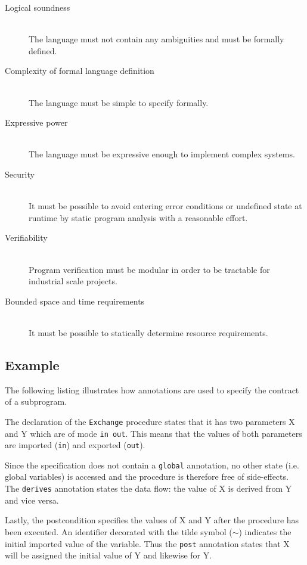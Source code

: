 \begin{description}
	\item[Logical soundness] \hfill \\
		The language must not contain any ambiguities and must be formally
		defined.
	\item[Complexity of formal language definition] \hfill \\
		The language must be simple to specify formally.
	\item[Expressive power] \hfill \\
		The language must be expressive enough to implement complex systems.
	\item[Security] \hfill \\
		It must be possible to avoid entering error conditions or undefined
		state at runtime by static program analysis with a reasonable effort.
	\item[Verifiability] \hfill \\
		Program verification must be modular in order to be tractable for
		industrial scale projects.
	\item[Bounded space and time requirements] \hfill \\
		It must be possible to statically determine resource requirements.
\end{description}

\subsection{Example}
The following listing illustrates how annotations are used to specify the
contract of a subprogram.



The declaration of the \texttt{Exchange} procedure states that it has two
parameters X and Y which are of mode \texttt{in out}. This means that the values
of both parameters are imported (\texttt{in}) and exported (\texttt{out}).

Since the specification does not contain a \texttt{global} annotation, no other
state (i.e. global variables) is accessed and the procedure is therefore free of
side-effects. The \texttt{derives} annotation states the data flow: the value of
X is derived from Y and vice versa.

Lastly, the postcondition specifies the values of X and Y after the procedure
has been executed. An identifier decorated with the tilde symbol ($\sim$)
indicates the initial imported value of the variable. Thus the \texttt{post}
annotation states that X will be assigned the initial value of Y and likewise
for Y.

